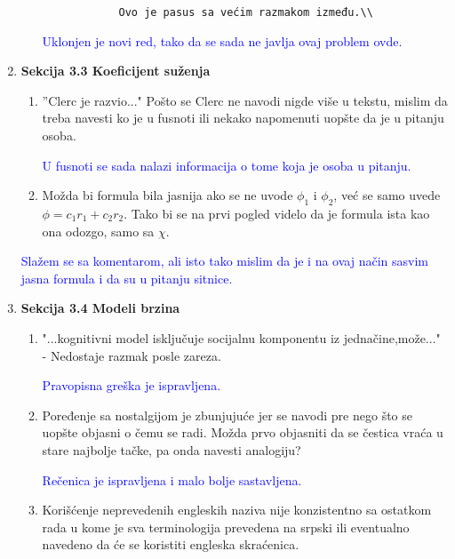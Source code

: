 \documentclass[a4paper]{report}
\newcommand{\odgovor}[1]{\textcolor{blue}{#1}}
\begin{document}
\begin{enumerate}
\begin{enumerate}
\begin{verbatim}
            Ovo je pasus sa većim razmakom između.\\
        \end{verbatim}
        
        \odgovor{Uklonjen je novi red, tako da se sada ne javlja ovaj problem ovde.}
        
    \end{enumerate}
    
    
    
    \item \textbf{Sekcija 3.3 Koeficijent suženja}
    \begin{enumerate}
        \item ''Clerc je razvio..." Pošto se Clerc ne navodi nigde više u tekstu, mislim da treba navesti ko je u fusnoti ili nekako napomenuti uopšte da je u pitanju osoba.
        
        \odgovor{U fusnoti se sada nalazi informacija o tome koja je osoba u pitanju.}
        
        \item Možda bi formula bila jasnija ako se ne uvode $\phi_1$ i $\phi_2$, već se samo uvede $\phi=c_1r_1+c_2r_2$. Tako bi se na prvi pogled videlo da je formula ista kao ona odozgo, samo sa $\chi$.
    \end{enumerate}
    
    \odgovor{Slažem se sa komentarom, ali isto tako mislim da je i na ovaj način sasvim jasna formula i da su u pitanju sitnice.}
    
    \item \textbf{Sekcija 3.4 Modeli brzina}
    \begin{enumerate}
        \item "...kognitivni model isključuje socijalnu komponentu iz jednačine,može..." - Nedostaje razmak posle zareza.
        
        \odgovor{Pravopisna greška je ispravljena.}
        
        \item Poređenje sa nostalgijom je zbunjujuće jer se navodi pre nego što se uopšte objasni o čemu se radi. Možda prvo objasniti da se čestica vraća u stare najbolje tačke, pa onda navesti analogiju?
        
        \odgovor{Rečenica je ispravljena i malo bolje sastavljena.}
        
        \item Korišćenje neprevedenih engleskih naziva nije konzistentno sa ostatkom rada u kome je sva terminologija prevedena na srpski ili eventualno navedeno da će se koristiti engleska skraćenica.
        

\end{enumerate}
\end{enumerate}
\end{document}
